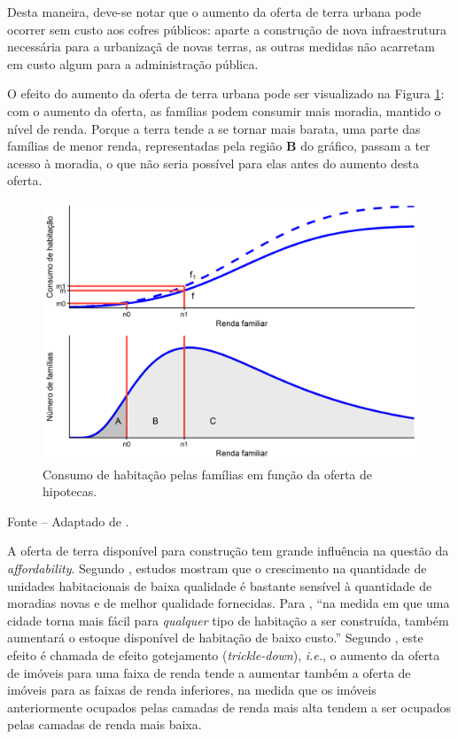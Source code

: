 \documentclass[
	12pt,				%
	oneside,			%
	a4paper,			%
	chapter=TITLE,		%
	section=TITLE,		%
	english,			%
	brazil				%
	]{abntex2}
\newcommand{\bcenter}{\begin{center}}
\newcommand{\ecenter}{\end{center}}
\begin{document}
\begin{refsection}
Desta maneira, deve-se notar que o aumento da oferta de terra urbana pode
ocorrer sem custo aos cofres públicos: aparte a construção de nova
infraestrutura necessária para a urbanizaçã de novas terras, as outras medidas
não acarretam em custo algum para a administração pública.

O efeito do aumento da oferta de terra urbana pode ser visualizado na Figura
\ref{fig:ofertaTerra}: com o aumento da oferta, as famílias podem consumir mais
moradia, mantido o nível de renda. Porque a terra tende a se tornar mais barata,
uma parte das famílias de menor renda, representadas pela região \textbf{B} do
gráfico, passam a ter acesso à moradia, o que não seria possível para elas antes
do aumento desta oferta.
\begin{figure}[H]

{\centering \includegraphics[width=0.7\linewidth]{images/ofertaTerra-1} 

}

\caption{Consumo de habitação pelas famílias em função da oferta de hipotecas.}\label{fig:ofertaTerra}
\end{figure}
\bcenter

Fonte -- Adaptado de \textcite[p.~253]{bertaud}.
\ecenter

A oferta de terra disponível para construção tem grande influência na questão da
\emph{affordability}. Segundo \textcite[p.~205]{quigley}, estudos mostram que o crescimento na
quantidade de unidades habitacionais de baixa qualidade é bastante sensível à
quantidade de moradias novas e de melhor qualidade fornecidas. Para
\textcite{MalpezziandGreen1996}, ``na medida em que uma cidade torna mais fácil para
\emph{qualquer} tipo de habitação a ser construída, também aumentará o estoque
disponível de habitação de baixo custo.'' Segundo \textcite[p.~239-240]{bertaud}, este
efeito é chamada de efeito gotejamento (\emph{trickle-down}), \emph{i.e.}, o aumento da
oferta de imóveis para uma faixa de renda tende a aumentar também a oferta de
imóveis para as faixas de renda inferiores, na medida que os imóveis
anteriormente ocupados pelas camadas de renda mais alta tendem a ser ocupados
pelas camadas de renda mais baixa.


\end{refsection}
\end{document}
